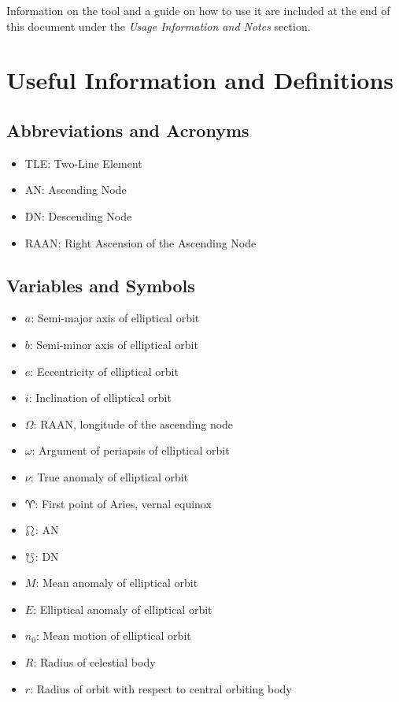 \documentclass[conference]{IEEEtran}
\begin{document}
		Information on the tool and a guide on how to use it are included at the end of this document under the \textit{Usage Information and Notes} section.

	\section{Useful Information and Definitions}

		\subsection{Abbreviations and Acronyms}\label{AA}
			\begin{itemize}
				\item TLE: Two-Line Element
				\item AN: Ascending Node
				\item DN: Descending Node
				\item RAAN: Right Ascension of the Ascending Node
			\end{itemize}

		\subsection{Variables and Symbols}
			\begin{itemize}
				\item \( a \): Semi-major axis of elliptical orbit
				\item \( b \): Semi-minor axis of elliptical orbit
				\item \( e \): Eccentricity of elliptical orbit
				\item \( i \): Inclination of elliptical orbit
				\item \( \Omega \): RAAN, longitude of the ascending node
				\item \( \omega \): Argument of periapsis of elliptical orbit
				\item \( \nu \): True anomaly of elliptical orbit
				\item \( \aries \): First point of Aries, vernal equinox
				\item \( \ascnode \): AN
				\item \( \descnode \): DN
				\item \( M \): Mean anomaly of elliptical orbit
				\item \( E \): Elliptical anomaly of elliptical orbit
				\item \( n_0 \): Mean motion of elliptical orbit
				\item \( R \): Radius of celestial body
				\item \( r \): Radius of orbit with respect to central orbiting body
			\end{itemize}
\end{document}
